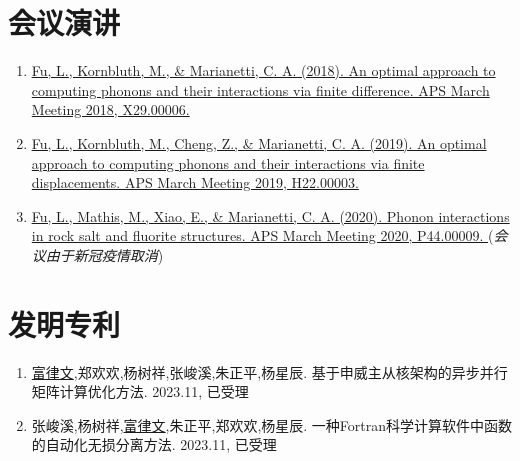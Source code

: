 \documentclass[
  a4paper,
  12pt
]{cv}
\begin{document}
%


\section{会议演讲}

\begin{enumerate}
\item
\href{https://meetings.aps.org/Meeting/MAR18/Event/322388}{
\underline{Fu, L.}, Kornbluth, M., \& Marianetti, C. A. (2018).
An optimal approach to computing phonons and their interactions via finite difference.
APS March Meeting 2018, X29.00006.
}
%
\item
\href{https://meetings.aps.org/Meeting/MAR19/Session/H22.3}{
\underline{Fu, L.}, Kornbluth, M., Cheng, Z., \& Marianetti, C. A. (2019).
An optimal approach to computing phonons and their interactions via finite displacements.
APS March Meeting 2019, H22.00003.
}
%
\item
\href{https://meetings.aps.org/Meeting/MAR20/Session/P44.9}{
\underline{Fu, L.}, Mathis, M., Xiao, E., \& Marianetti, C. A. (2020).
Phonon interactions in rock salt and fluorite structures.
APS March Meeting 2020, P44.00009.
} (\emph{会议由于新冠疫情取消})
\end{enumerate}


\section{发明专利}

\begin{enumerate}
\item
\underline{富律文},郑欢欢,杨树祥,张峻溪,朱正平,杨星辰.
基于申威主从核架构的异步并行矩阵计算优化方法.
2023.11, 已受理
%
\item
张峻溪,杨树祥,\underline{富律文},朱正平,郑欢欢,杨星辰.
一种Fortran科学计算软件中函数的自动化无损分离方法.
2023.11, 已受理
\end{enumerate}
\end{document}
